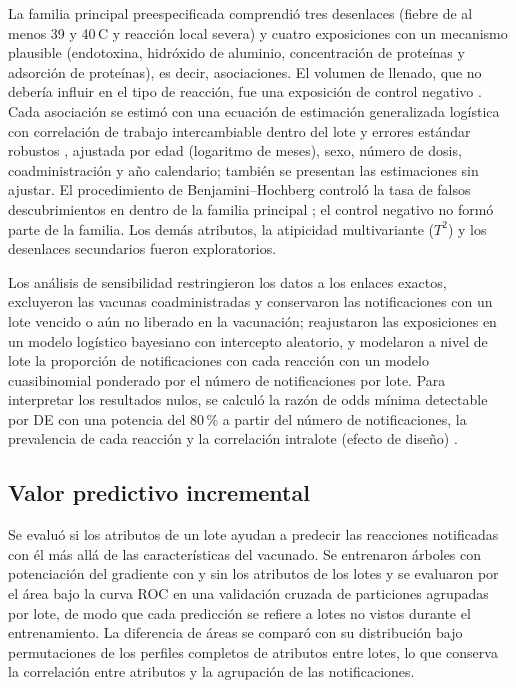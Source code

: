 \documentclass[11pt]{article}
\begin{document}
La familia principal preespecificada comprendió tres desenlaces (fiebre de al menos 39 y
40\,\textdegree{}C y reacción local severa) y cuatro exposiciones con un mecanismo plausible
(endotoxina, hidróxido de aluminio, concentración de proteínas y adsorción de proteínas), es decir,
\PTNPrimaryTests{} asociaciones. El volumen de llenado, que no debería influir en el tipo de
reacción, fue una exposición de control negativo \cite{Lipsitch2010,Arnold2016}. Cada asociación se
estimó con una ecuación de estimación generalizada logística con correlación de trabajo
intercambiable dentro del lote y errores estándar robustos \cite{Liang1986,Zeger1986}, ajustada por
edad (logaritmo de meses), sexo, número de dosis, coadministración y año calendario; también se
presentan las estimaciones sin ajustar. El procedimiento
de Benjamini--Hochberg controló la tasa de falsos descubrimientos en \PTFDRAlpha{} dentro de la
familia principal \cite{Benjamini1995}; el control negativo no formó parte de la familia. Los demás
atributos, la atipicidad multivariante ($T^2$) y los desenlaces secundarios fueron exploratorios.

Los análisis de sensibilidad restringieron los datos a los enlaces exactos, excluyeron las vacunas
coadministradas y conservaron las notificaciones con un lote vencido o aún no liberado en la vacunación; reajustaron las exposiciones en
un modelo logístico bayesiano con intercepto aleatorio, y modelaron a nivel de lote la proporción de
notificaciones con cada reacción con un modelo cuasibinomial ponderado por el número de
notificaciones por lote. Para interpretar los resultados nulos, se calculó la razón de odds mínima
detectable por DE con una potencia del 80\,\% a partir del número de notificaciones, la prevalencia
de cada reacción y la correlación intralote (efecto de diseño) \cite{Hsieh1998}.

\subsection{Valor predictivo incremental}\label{sec:m-ml}
Se evaluó si los atributos de un lote ayudan a predecir las reacciones notificadas con él más allá
de las características del vacunado. Se entrenaron árboles con potenciación del gradiente
\cite{Ke2017} con y sin los atributos de los lotes y se evaluaron por el área bajo la curva ROC en
una validación cruzada de \PTCVFolds{} particiones agrupadas por lote, de modo que cada predicción
se refiere a lotes no vistos durante el entrenamiento. La diferencia de áreas se comparó con su
distribución bajo \PTNPermutations{} permutaciones de los perfiles completos de atributos entre lotes,
lo que conserva la correlación entre atributos y la agrupación de las notificaciones.
\end{document}

